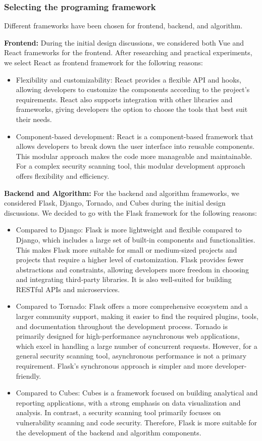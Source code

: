 \documentclass[journal]{IEEEtran}
\begin{document}
\subsubsection{Selecting the programing framework}
Different frameworks have been chosen for frontend, backend, and algorithm.

\textbf{Frontend:} During the initial design discussions, we considered both Vue and React frameworks for the frontend. After researching and practical experiments, we select React as frontend framework for the following reasons:

\begin{itemize}
  \item Flexibility and customizability: React provides a flexible API and hooks, allowing developers to customize the components according to the project's requirements. React also supports integration with other libraries and frameworks, giving developers the option to choose the tools that best suit their needs.
  \item Component-based development: React is a component-based framework that allows developers to break down the user interface into reusable components. This modular approach makes the code more manageable and maintainable. For a complex security scanning tool, this modular development approach offers flexibility and efficiency.
\end{itemize}

\textbf{Backend and Algorithm:} For the backend and algorithm frameworks, we considered Flask, Django, Tornado, and Cubes during the initial design discussions. We decided to go with the Flask framework for the following reasons:
\begin{itemize}
\item Compared to Django:
Flask is more lightweight and flexible compared to Django, which includes a large set of built-in components and functionalities. This makes Flask more suitable for small or medium-sized projects and projects that require a higher level of customization.
Flask provides fewer abstractions and constraints, allowing developers more freedom in choosing and integrating third-party libraries. It is also well-suited for building RESTful APIs and microservices.
\item Compared to Tornado:
Flask offers a more comprehensive ecosystem and a larger community support, making it easier to find the required plugins, tools, and documentation throughout the development process.
Tornado is primarily designed for high-performance asynchronous web applications, which excel in handling a large number of concurrent requests. However, for a general security scanning tool, asynchronous performance is not a primary requirement. Flask's synchronous approach is simpler and more developer-friendly.
\item Compared to Cubes:
Cubes is a framework focused on building analytical and reporting applications, with a strong emphasis on data visualization and analysis. In contrast, a security scanning tool primarily focuses on vulnerability scanning and code security. Therefore, Flask is more suitable for the development of the backend and algorithm components.
\end{itemize}
\end{document}
